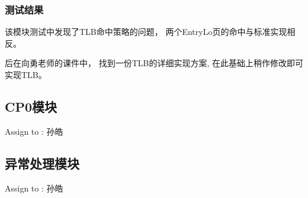         \subsubsection{测试结果}
            该模块测试中发现了TLB命中策略的问题，%
            两个EntryLo页的命中与标准实现相反。%

            后在向勇老师的课件中，%
            找到一份TLB的详细实现方案,%
            在此基础上稍作修改即可实现TLB。

    \subsection{CP0模块}
        Assign to  : 孙皓

    \subsection{异常处理模块}
        Assign to  : 孙皓
